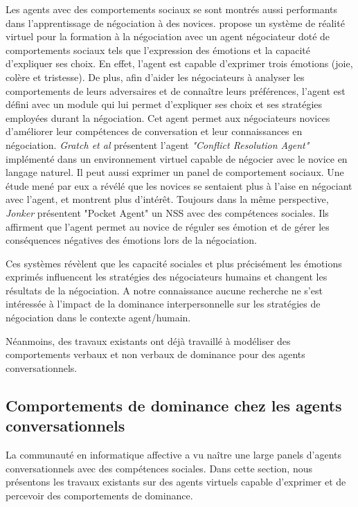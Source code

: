 	 
	 Les agents avec des comportements sociaux se sont montrés aussi performants dans l'apprentissage de négociation à des novices. \cite{broekens2012virtual} propose un système de réalité virtuel pour la formation à la négociation avec un agent négociateur doté de comportements sociaux tels que l'expression des émotions et la capacité d'expliquer ses choix. En effet, l'agent est capable d'exprimer trois émotions (joie, colère et tristesse). De plus, afin d'aider les négociateurs à analyser les comportements de leurs adversaires et de connaître leurs préférences, l'agent est défini avec un module qui lui permet d'expliquer ses choix et ses stratégies employées durant la négociation. Cet agent permet aux négociateurs novices d'améliorer leur compétences de conversation et leur connaissances en négociation. 
	 \emph{Gratch et al} \cite{gratch2016benefits} présentent l'agent \textit{"Conflict Resolution Agent"} implémenté dans un environnement virtuel capable de négocier avec le novice en langage naturel. Il peut aussi exprimer un panel de comportement sociaux. Une étude mené par eux a révélé que les novices se sentaient plus à l'aise en négociant avec l'agent, et montrent plus d'intérêt. Toujours dans la même perspective, \emph{Jonker} \cite{jonker2012negotiating} présentent "Pocket Agent" un NSS avec des compétences sociales. Ils affirment que l'agent permet au novice de réguler ses émotion et de gérer les conséquences négatives des émotions lors de la négociation.
	 
	 Ces systèmes révèlent que les capacité sociales et plus précisément les émotions exprimés influencent les stratégies des négociateurs humains et changent les résultats de la négociation. A notre connaissance aucune recherche ne s'est intéressée à l'impact de la dominance interpersonnelle sur les stratégies de négociation dans le contexte agent/humain. 
	 
	 Néanmoins, des travaux existants ont déjà travaillé à modéliser des comportements verbaux et non verbaux de dominance pour des agents conversationnels. 
	 
	 \subsection{Comportements de dominance chez les agents conversationnels}
	 
	 	La communauté en informatique affective a vu naître une large panels d'agents conversationnels avec des compétences sociales. Dans cette section, nous présentons les travaux existants sur des agents virtuels capable d'exprimer et de percevoir des comportements de dominance. 
	 	
